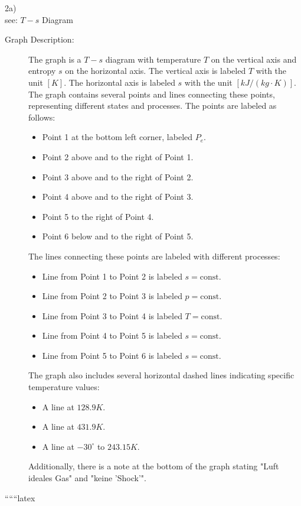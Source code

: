 2a) \\
see: \( T - s \) Diagram

\begin{description}
    \item[Graph Description:] 
    The graph is a \( T - s \) diagram with temperature \( T \) on the vertical axis and entropy \( s \) on the horizontal axis. The vertical axis is labeled \( T \) with the unit \([K]\). The horizontal axis is labeled \( s \) with the unit \([kJ/(kg \cdot K)]\). The graph contains several points and lines connecting these points, representing different states and processes. The points are labeled as follows:
    \begin{itemize}
        \item Point 1 at the bottom left corner, labeled \( P_e \).
        \item Point 2 above and to the right of Point 1.
        \item Point 3 above and to the right of Point 2.
        \item Point 4 above and to the right of Point 3.
        \item Point 5 to the right of Point 4.
        \item Point 6 below and to the right of Point 5.
    \end{itemize}
    The lines connecting these points are labeled with different processes:
    \begin{itemize}
        \item Line from Point 1 to Point 2 is labeled \( s = \text{const} \).
        \item Line from Point 2 to Point 3 is labeled \( p = \text{const} \).
        \item Line from Point 3 to Point 4 is labeled \( T = \text{const} \).
        \item Line from Point 4 to Point 5 is labeled \( s = \text{const} \).
        \item Line from Point 5 to Point 6 is labeled \( s = \text{const} \).
    \end{itemize}
    The graph also includes several horizontal dashed lines indicating specific temperature values:
    \begin{itemize}
        \item A line at \( 128.9K \).
        \item A line at \( 431.9K \).
        \item A line at \( -30^\circ \) to \( 243.15K \).
    \end{itemize}
    Additionally, there is a note at the bottom of the graph stating "Luft ideales Gas" and "keine 'Shock'".
\end{description}

``````latex